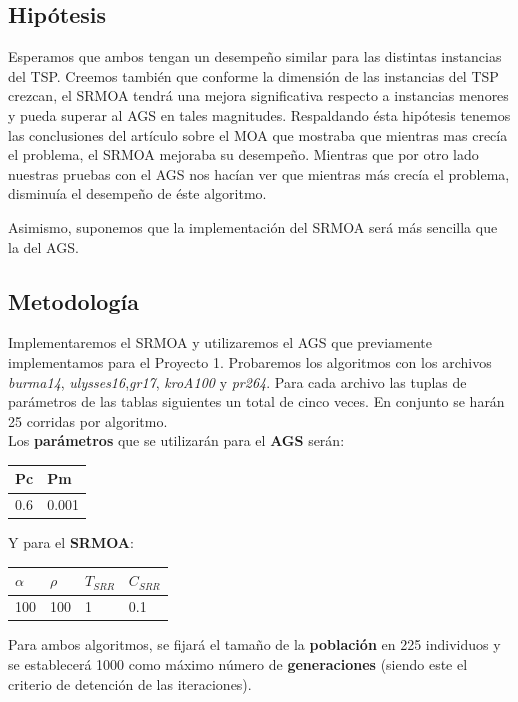\documentclass[12pt]{article}
\begin{document}
\subsection*{Hipótesis}
 Esperamos que ambos tengan un desempeño similar para las distintas instancias del TSP. Creemos también que conforme la dimensión de las instancias del TSP crezcan, el SRMOA tendrá una mejora significativa respecto a instancias menores y pueda superar al AGS en tales magnitudes.  Respaldando ésta hipótesis tenemos las conclusiones del artículo sobre el MOA que mostraba que mientras mas crecía el problema, el SRMOA mejoraba su desempeño. Mientras que por otro lado nuestras pruebas con el AGS nos hacían ver que mientras más crecía el problema, disminuía el desempeño de éste algoritmo.

Asimismo, suponemos que la implementación del SRMOA será más sencilla que la del AGS.
\subsection*{Metodología}\label{sec:met}
Implementaremos el SRMOA y utilizaremos el AGS que previamente implementamos para el Proyecto 1. Probaremos los algoritmos con los archivos \textit{burma14}, \textit{ulysses16},\textit{gr17}, \textit{kroA100} y \textit{pr264}. Para cada archivo las tuplas de parámetros de las tablas siguientes un total de cinco veces. En conjunto se harán 25 corridas por algoritmo.\\


Los \textbf{parámetros} que se utilizarán para el \textbf{AGS} serán:
\begin{center}
\begin{tabularx}{0.25\textwidth}{|X|X|}
  \hline
\textbf{Pc} &  \textbf{Pm} \\ \hline
0.6 & 0.001 \\ \hline
\end{tabularx}
\end{center}

Y para el \textbf{SRMOA}:
\begin{center}
\begin{tabularx}{0.30\textwidth}{|X|X|X|X|}
  \hline
\textbf{$\alpha$} &  \textbf{$\rho$} & \textbf{$T_{SRR}$} & \textbf{$C_{SRR}$}\\ \hline
100 & 100 & 1 & 0.1 \\ \hline
\end{tabularx}
\end{center}

Para ambos algoritmos, se fijará el tamaño de la \textbf{población} en 225 individuos y se establecerá 1000 como máximo número de \textbf{generaciones} (siendo este el criterio de detención de las iteraciones).
\end{document}
